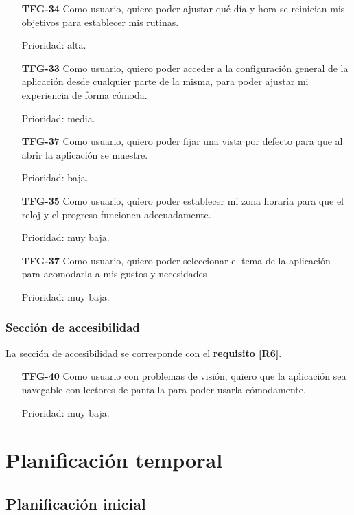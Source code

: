 \documentclass[10pt, a4paper]{aqademic}
\begin{document}
\begin{itemize}[leftmargin=16mm]
	\item [\textbf{TFG-34}] Como usuario, quiero poder ajustar qué día y hora se reinician mis objetivos para establecer mis rutinas.
	
	Prioridad: alta.
	
	\item [\textbf{TFG-33}] Como usuario, quiero poder acceder a la configuración general de la aplicación desde cualquier parte de la misma, para poder ajustar mi experiencia de forma cómoda.
	
	Prioridad: media.
	
	
	\item [\textbf{TFG-37}] Como usuario, quiero poder fijar una vista por defecto para que al abrir la aplicación se muestre.
	
	Prioridad: baja.
	
	\item [\textbf{TFG-35}] Como usuario, quiero poder establecer mi zona horaria para que el reloj y el progreso funcionen adecuadamente.

	Prioridad: muy baja.
	
	\item [\textbf{TFG-37}] Como usuario, quiero poder seleccionar el tema de la aplicación para acomodarla a mis gustos y necesidades 
	
	Prioridad: muy baja.
\end{itemize}

\subsubsection*{Sección de accesibilidad}

La sección de accesibilidad se corresponde con el \textbf{requisito [R6]}.

\begin{itemize}[leftmargin=16mm]
	\item [\textbf{TFG-40}] Como usuario con problemas de visión, quiero que la aplicación sea navegable con lectores de pantalla para poder usarla cómodamente.
	
	Prioridad: muy baja. 
\end{itemize}


\section{Planificación temporal}

\subsection{Planificación inicial}
\end{document}
